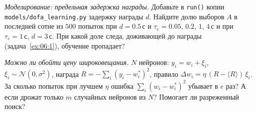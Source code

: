 \begin{exercise}[\lvlB]
\label{ex:06:7}
\emph{Моделирование: предельная задержка награды.} Добавьте в \texttt{run()} копии \texttt{models/\allowbreak dofa\_learning.py} задержку награды $d$. Найдите долю выборов $A$ в последней сотне из $500$ попыток при $d=0.5\,\text{с}$ и $\tau_e=0.05$, $0.2$, $1$, $4\,\text{с}$ и при $\tau_e=1\,\text{с}$, $d=3\,\text{с}$. При какой доле следа, доживающей до награды (задача~\ref{ex:06:1}), обучение пропадает?
\end{exercise}

\begin{exercise}[\lvlC]
\label{ex:06:8}
\emph{Можно ли обойти цену широковещания.} $N$ нейронов: $y_i=w_i+\xi_i$, $\xi_i\sim\mathcal N(0,\sigma^2)$, награда $R=-\sum_i(y_i-w_i^*)^2$, правило $\Delta w_i=\eta\,(R-\langle R\rangle)\,\xi_i$. За сколько попыток при лучшем $\eta$ ошибка $\sum_i(w_i-w_i^*)^2$ убывает в $e$ раз? А если дрожат только $m$ случайных нейронов из $N$? Помогает ли разреженный поиск?
\end{exercise}
